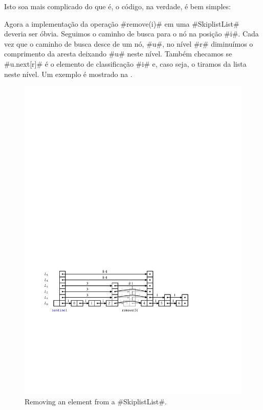 Isto soa mais complicado do que é, o código, na verdade, 
é bem simples:



Agora a implementação da 
operação #remove(i)# em uma #SkiplistList# deveria ser óbvia.  Seguimos o caminho de busca para o nó na posição #i#. Cada vez que o caminho de busca desce de um nó, #u#, no nível #r# diminuímos o comprimento da aresta deixando #u# neste nível.  Também checamos se #u.next[r]# é o elemento de classificação #i# e, caso seja, o tiramos da lista neste nível. Um exemplo é mostrado na .
\begin{figure}
	\begin{center}
		\includegraphics[width=\ScaleIfNeeded]{figs/skiplist-removei}
	\end{center}
	\caption[Removing an element from a SkiplistList]{Removing an element from a #SkiplistList#.}
\end{figure}

